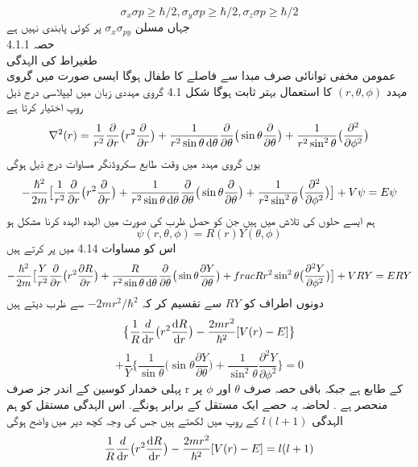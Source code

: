 \documentclass{book}
\begin{document}
 \[\sigma_{x}\sigma{p}\geq\hbar/2,\sigma_{y}\sigma{p}\geq\hbar/2,\sigma_{z}\sigma{p}\geq\hbar/2\]
جہاں مسلن 
\(\sigma_{x}\sigma_{py}\)
 پر کوئی پابندی نہیں ہے\\
حصہ 4.1.1 \\
طغیراط کی الہدگی\\ 
  عمومن مخفی توانائی صرف مبدا سے فاصلے کا طفال ہوگا 
ایسی صورت میں گروی مہدد
 \((r,\theta,\phi)\)
  کا استعمال بہتر ثابت ہوگا 
شکل 4.1 
گروی مہددی زبان میں لیپلاسی درج ذیل روپ اختیار کرتا ہے \\
\[\nabla^{2}(r)=\frac{1}{r^{2}}\frac{\partial}{\partial{r}}\big (r^{2}\frac{\partial}{\partial{r}}\big )+\frac{1}{r^{2}\sin{\theta}\dif{\theta}}\frac{\partial}{\partial{\theta}}\big(\sin{\theta}\frac{\partial}{\partial{\theta}}\big )+\frac{1}{r^{2}\sin^{2}{\theta}}\big(\frac{\partial^{2}}{\partial{\phi^{2}}}\big )\]
یوں گروی مہدد میں وقت طابع سکروڈنگر مساوات درج ذیل ہوگی 
\[-\frac{\hbar^{2}}{2m}\big [\frac{1}{r^{2}}\frac{\partial}{\partial{r}}\big (r^{2}\frac{\partial}{\partial{r}}\big )+\frac{1}{r^{2}\sin{\theta}\dif{\theta}}\frac{\partial}{\partial{\theta}}\big(\sin{\theta}\frac{\partial}{\partial{\theta}}\big )+\frac{1}{r^{2}\sin^{2}{\theta}}\big(\frac{\partial^{2}}{\partial{\phi^{2}}}\big )\big ]+V\psi=E\psi\]
ہم ایسے حلوں کی تلاش میں ہیں جن کو حصل ظرب کی صورت میں الہدہ الہدہ کرنا مشکل ہو \\
\[\psi(r,\theta,\phi)=R(r)Y(\theta,\phi)\]
اس کو مساوات 4.14 میں پر کرتے ہیں \\
\[-\frac{\hbar^{2}}{2m}\big [\frac{Y}{r^{2}}\frac{\partial}{\partial{r}}\big (r^{2}\frac{\partial{R}}{\partial{r}}\big )+\frac{R}{r^{2}\sin{\theta}\dif{\theta}}\frac{\partial}{\partial{\theta}}\big(\sin{\theta}\frac{\partial{Y}}{\partial{\theta}}\big )+frac{R}{r^{2}\sin^{2}{\theta}}\big(\frac{\partial^{2}{Y}}{\partial{\phi^{2}}}\big )\big ]+VRY=ERY\]
دونوں اطراف کو
\(RY\)
سے تقسیم کر کہ 
\(-2mr^{2}/\hbar^{2}\)
سے ظرب دیتے ہیں \\
\[\big\{\frac{1}{R}\frac{d}{\dif{r}}\big(r^{2}\frac{\dif{R}}{\dif{r}}\big)-\frac{2mr^{2}}{\hbar^{2}}[V(r)-E]\big\}\]
\[+\frac{1}{Y}\big\{\frac{1}{\sin{\theta}}\big(\sin{\theta}\frac{\partial{Y}}{\partial{\theta}}\big)+\frac{1}{\sin^{2}{\theta}}\frac{\partial^{2}{Y}}{\partial{\phi^{2}}}\big\}=0\]
پہلی خمدار کوسین کے اندر جز صرف r کے طابع ہے جبکہ باقی حصہ صرف
 \(\theta\)
  اور
  \(\phi\)
    پر منحصر ہے .
لحاضہ یہ حصے ایک مستقل کے برابر ہونگے. 
اس الہدگی مستقل کو ہم الہدگی
\(l(l+1)\)
کے روپ میں لکھتے ہیں جس کی وجہ کچھ دیر میں واضح ہوگی \\
\[\frac{1}{R}\frac{d}{\dif{r}}\big(r^{2}\frac{\dif{R}}{\dif{r}}\big)-\frac{2mr^{2}}{\hbar^{2}}[V(r)-E]=l(l+1)\]
\end{document}
